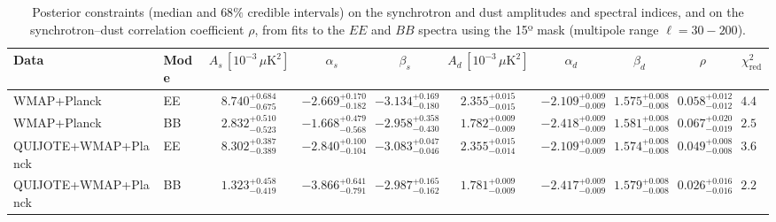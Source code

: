 \begin{table}[h]
\centering
\scriptsize
\setlength{\tabcolsep}{4pt}
\caption{Posterior constraints (median and $68\%$ credible intervals) on the synchrotron and dust amplitudes and spectral indices, and on the synchrotron--dust correlation coefficient $\rho$, from fits to the $EE$ and $BB$ spectra using the 15º mask (multipole range $\ell=30-200$).}
\label{tab:fit_results}
\begin{tabular}{llcccccccc}
\toprule
Data & Mode & $A_s\,[10^{-3}\,\mu\mathrm{K}^2]$ & $\alpha_s$ & $\beta_s$ & $A_d\,[10^{-3}\,\mu\mathrm{K}^2]$ & $\alpha_d$ & $\beta_d$ & $\rho$ & $\chi^2_\mathrm{red}$ \\
\midrule
WMAP+Planck & EE & $8.740^{+0.684}_{-0.675}$ & $-2.669^{+0.170}_{-0.182}$ & $-3.134^{+0.169}_{-0.180}$ & $2.355^{+0.015}_{-0.015}$ & $-2.109^{+0.009}_{-0.009}$ & $1.575^{+0.008}_{-0.008}$ & $0.058^{+0.012}_{-0.012}$ & $4.44$ \\
WMAP+Planck & BB & $2.832^{+0.510}_{-0.523}$ & $-1.668^{+0.479}_{-0.568}$ & $-2.958^{+0.358}_{-0.430}$ & $1.782^{+0.009}_{-0.009}$ & $-2.418^{+0.009}_{-0.009}$ & $1.581^{+0.008}_{-0.008}$ & $0.067^{+0.020}_{-0.019}$ & $2.50$ \\
QUIJOTE+WMAP+Planck & EE & $8.302^{+0.387}_{-0.389}$ & $-2.840^{+0.100}_{-0.104}$ & $-3.083^{+0.047}_{-0.046}$ & $2.355^{+0.015}_{-0.014}$ & $-2.109^{+0.009}_{-0.009}$ & $1.574^{+0.008}_{-0.008}$ & $0.049^{+0.008}_{-0.008}$ & $3.66$ \\
QUIJOTE+WMAP+Planck & BB & $1.323^{+0.458}_{-0.419}$ & $-3.866^{+0.641}_{-0.791}$ & $-2.987^{+0.165}_{-0.162}$ & $1.781^{+0.009}_{-0.009}$ & $-2.417^{+0.009}_{-0.009}$ & $1.579^{+0.008}_{-0.008}$ & $0.026^{+0.016}_{-0.016}$ & $2.24$ \\
\bottomrule
\end{tabular}
\end{table}
